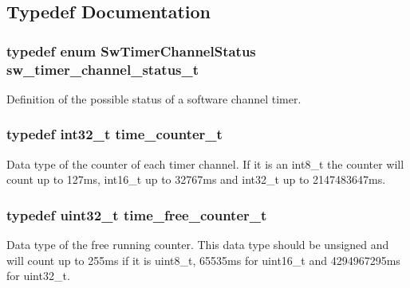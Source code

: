 \subsection{Typedef Documentation}
\subsubsection[{\texorpdfstring{sw\+\_\+timer\+\_\+channel\+\_\+status\+\_\+t}{sw_timer_channel_status_t}}]{\setlength{\rightskip}{0pt plus 5cm}typedef enum {\bf Sw\+Timer\+Channel\+Status} {\bf sw\+\_\+timer\+\_\+channel\+\_\+status\+\_\+t}}\hypertarget{group__sw__timer_ga11c8ba265a273d5d3dda5e269163d3e7}{}\label{group__sw__timer_ga11c8ba265a273d5d3dda5e269163d3e7}
Definition of the possible status of a software channel timer. 
\subsubsection[{\texorpdfstring{time\+\_\+counter\+\_\+t}{time_counter_t}}]{\setlength{\rightskip}{0pt plus 5cm}typedef int32\+\_\+t {\bf time\+\_\+counter\+\_\+t}}\hypertarget{group__sw__timer_ga85b49889ff28c6bc6a5368a08b0f9650}{}\label{group__sw__timer_ga85b49889ff28c6bc6a5368a08b0f9650}
Data type of the counter of each timer channel. If it is an int8\+\_\+t the counter will count up to 127ms, int16\+\_\+t up to 32767ms and int32\+\_\+t up to 2147483647ms. 
\subsubsection[{\texorpdfstring{time\+\_\+free\+\_\+counter\+\_\+t}{time_free_counter_t}}]{\setlength{\rightskip}{0pt plus 5cm}typedef uint32\+\_\+t {\bf time\+\_\+free\+\_\+counter\+\_\+t}}\hypertarget{group__sw__timer_gaf131d055058588461e646ccea72592bc}{}\label{group__sw__timer_gaf131d055058588461e646ccea72592bc}
Data type of the free running counter. This data type should be unsigned and will count up to 255ms if it is uint8\+\_\+t, 65535ms for uint16\+\_\+t and 4294967295ms for uint32\+\_\+t. 

